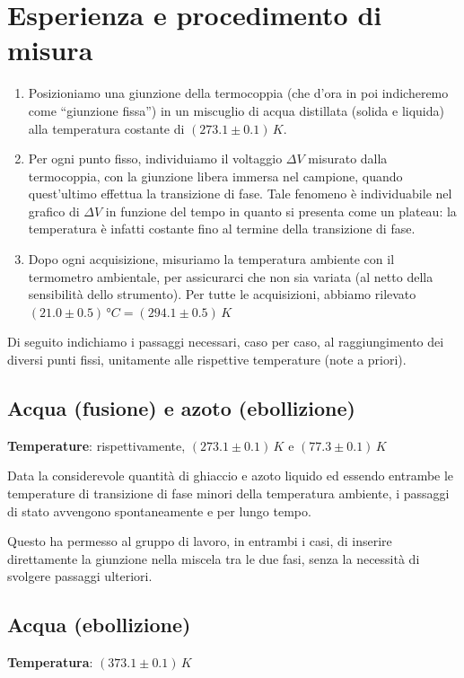 \documentclass{article}
\begin{document}
\pagebreak
\section{Esperienza e procedimento di misura}

\begin{enumerate}
  \item
    Posizioniamo una giunzione della termocoppia (che d'ora in poi indicheremo
    come “giunzione fissa”) in un miscuglio %
    di acqua distillata (solida e liquida) alla temperatura
    costante di $(273.1\pm0.1)\,\unit{K}$.
  \item
    Per ogni punto fisso, individuiamo il voltaggio $\Delta V$ misurato dalla
    termocoppia, con la giunzione libera immersa nel campione,
    quando quest'ultimo effettua la transizione
    di fase. Tale fenomeno è individuabile nel grafico di $\Delta V$ in funzione
    del tempo in quanto si presenta come un plateau: la temperatura è infatti
    costante fino al termine della transizione di fase.
  \item
    Dopo ogni acquisizione, misuriamo la temperatura ambiente con il termometro
    ambientale, per assicurarci che non sia variata (al netto della sensibilità
    dello strumento). Per tutte le acquisizioni, abbiamo rilevato
    $(21.0\pm0.5)\,\unit{\degree C} = (294.1\pm0.5)\,\unit{K}$
\end{enumerate}
Di seguito indichiamo i passaggi necessari, caso per caso,
al raggiungimento dei diversi punti fissi, unitamente alle
rispettive temperature (note a priori).

\subsection*{Acqua (fusione) e azoto (ebollizione)}
\textbf{Temperature}: rispettivamente, $(273.1\pm0.1)\,\unit{K}$ e $(77.3\pm0.1)\,\unit{K}$
\vspace{1mm}

Data la considerevole quantità di ghiaccio e azoto liquido ed essendo
entrambe le temperature di transizione di fase minori della temperatura
ambiente, i passaggi di stato avvengono spontaneamente e per lungo tempo.

Questo ha permesso al gruppo di lavoro, in entrambi i casi,
di inserire direttamente la giunzione nella miscela tra le due fasi,
senza la necessità di svolgere passaggi ulteriori.

\subsection*{Acqua (ebollizione)}
\textbf{Temperatura}: $(373.1\pm0.1)\,\unit{K}$
\vspace{1mm}
\end{document}

